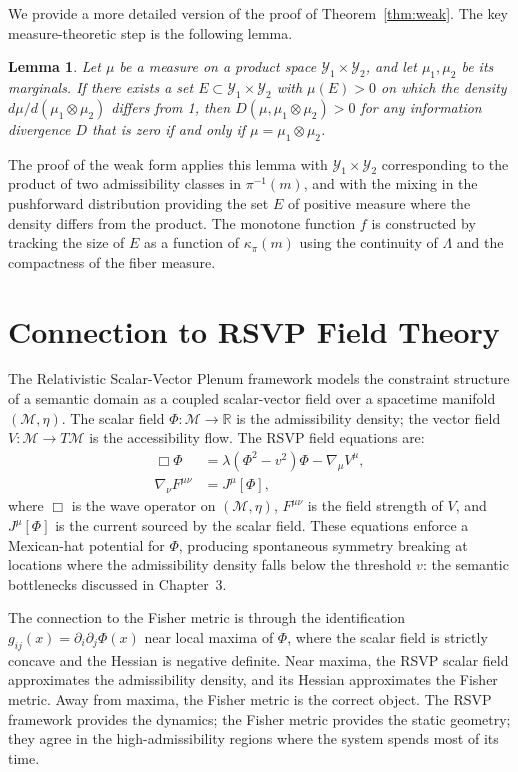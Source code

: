 \documentclass[12pt, oneside]{book}
\theoremstyle{plain-flyxion}
\newtheorem{lemma}[theorem]{Lemma}
\theoremstyle{definition-flyxion}
\newcommand{\kpi}{\kappa_{\pi}}
\newcommand{\Lam}{\Lambda}
\begin{document}
We provide a more detailed version of the proof of Theorem~\ref{thm:weak}. The key
measure-theoretic step is the following lemma.

\begin{lemma}\label{lem:divergence}
Let $\mu$ be a measure on a product space $\mathcal{Y}_1\times\mathcal{Y}_2$, and let
$\mu_1, \mu_2$ be its marginals. If there exists a set $E\subset\mathcal{Y}_1\times
\mathcal{Y}_2$ with $\mu(E)>0$ on which the density $d\mu/d(\mu_1\otimes\mu_2)$ differs
from 1, then $D(\mu, \mu_1\otimes\mu_2)>0$ for any information divergence $D$ that is
zero if and only if $\mu = \mu_1\otimes\mu_2$.
\end{lemma}

The proof of the weak form applies this lemma with $\mathcal{Y}_1\times\mathcal{Y}_2$
corresponding to the product of two admissibility classes in $\pi^{-1}(m)$, and with the
mixing in the pushforward distribution providing the set $E$ of positive measure where
the density differs from the product. The monotone function $f$ is constructed by
tracking the size of $E$ as a function of $\kpi(m)$ using the continuity of $\Lam$ and
the compactness of the fiber measure.

\chapter{Connection to RSVP Field Theory}

The Relativistic Scalar-Vector Plenum framework models the constraint structure of a
semantic domain as a coupled scalar-vector field over a spacetime manifold $(\mathcal{M},
\eta)$. The scalar field $\Phi:\mathcal{M}\to\mathbb{R}$ is the
admissibility density; the vector field $V:\mathcal{M}\to T\mathcal{M}$ is the
accessibility flow. The RSVP field equations are:
\begin{align}
\Box\Phi &= \lambda(\Phi^2 - v^2)\Phi - \nabla_\mu V^\mu, \\
\nabla_\nu F^{\mu\nu} &= J^\mu[\Phi],
\end{align}
where $\Box$ is the wave operator on $(\mathcal{M},\eta)$, $F^{\mu\nu}$ is the field
strength of $V$, and $J^\mu[\Phi]$ is the current sourced by the scalar field. These
equations enforce a Mexican-hat potential for $\Phi$, producing spontaneous symmetry
breaking at locations where the admissibility density falls below the threshold $v$: the
semantic bottlenecks discussed in Chapter~3.

The connection to the Fisher metric is through the identification $g_{ij}(x) = \partial_i
\partial_j \Phi(x)$ near local maxima of $\Phi$, where the scalar field is strictly
concave and the Hessian is negative definite. Near maxima, the RSVP scalar field
approximates the admissibility density, and its Hessian approximates the Fisher metric.
Away from maxima, the Fisher metric is the correct object. The RSVP framework provides
the dynamics; the Fisher metric provides the static geometry; they agree in the
high-admissibility regions where the system spends most of its time.
\end{document}
